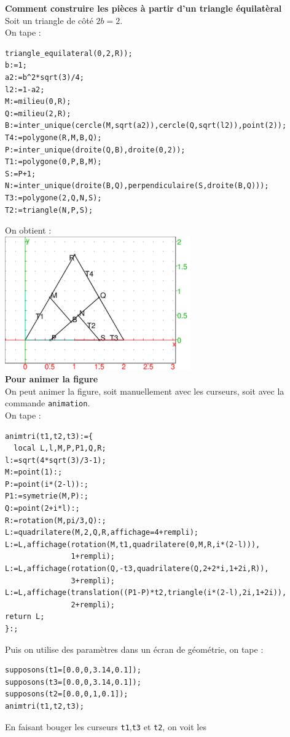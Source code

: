 \documentclass[a4paper,11pt]{book}
\begin{document}
{\bf Comment construire les pi\`eces \`a partir d'un triangle \'equilat\`eral}\\
Soit un triangle de c\^ot\'e $2b=2$.\\
On tape :\\
\begin{verbatim}
triangle_equilateral(0,2,R));
b:=1;
a2:=b^2*sqrt(3)/4;
l2:=1-a2;
M:=milieu(0,R);
Q:=milieu(2,R);
B:=inter_unique(cercle(M,sqrt(a2)),cercle(Q,sqrt(l2)),point(2));
T4:=polygone(R,M,B,Q);
P:=inter_unique(droite(Q,B),droite(0,2));
T1:=polygone(0,P,B,M);
S:=P+1;
N:=inter_unique(droite(B,Q),perpendiculaire(S,droite(B,Q)));
T3:=polygone(2,Q,N,S);
T2:=triangle(N,P,S);
\end{verbatim}
On obtient :\\
\includegraphics[width=8cm]{puzzlecan0}\\
{\bf Pour animer la figure}\\
On peut animer la figure, soit manuellement avec les curseurs, soit avec la 
commande {\tt animation}.\\
On tape :
\begin{verbatim}
animtri(t1,t2,t3):={
  local L,l,M,P,P1,Q,R;
l:=sqrt(4*sqrt(3)/3-1);
M:=point(1):;
P:=point(i*(2-l)):;
P1:=symetrie(M,P):;
Q:=point(2+i*l):;
R:=rotation(M,pi/3,Q):;
L:=quadrilatere(M,2,Q,R,affichage=4+rempli); 
L:=L,affichage(rotation(M,t1,quadrilatere(0,M,R,i*(2-l))),
               1+rempli); 
L:=L,affichage(rotation(Q,-t3,quadrilatere(Q,2+2*i,1+2i,R)),
               3+rempli); 
L:=L,affichage(translation((P1-P)*t2,triangle(i*(2-l),2i,1+2i)),
               2+rempli);
return L;
}:;
\end{verbatim}
Puis on utilise des param\`etres dans un \'ecran de g\'eom\'etrie, on tape :
\begin{verbatim}
supposons(t1=[0.0,0,3.14,0.1]);
supposons(t3=[0.0,0,3.14,0.1]);
supposons(t2=[0.0,0,1,0.1]);
animtri(t1,t2,t3);
\end{verbatim}
En faisant bouger les curseurs {\tt t1},{\tt t3} et {\tt t2}, on voit les 
\end{document}
